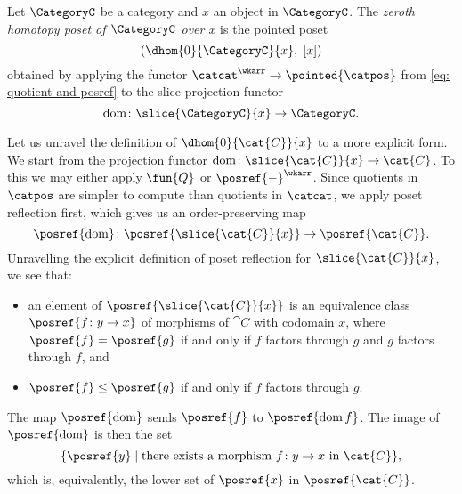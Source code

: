 %
%
\begin{definition} \label{def: 0th-directed homotopy poset}
    Let $\CategoryC$ be a category and $x$ an object in $\CategoryC$.
    The \emph{zeroth homotopy poset of $\CategoryC$ over $x$} is the pointed poset
    \begin{equation*}
        (\dhom{0}{\CategoryC}{x}, \; [x])
    \end{equation*}
    obtained by applying the functor $\catcat^\wkarr \to \pointed{\catpos}$ from \autoref{eq: quotient and posref} to the slice projection functor
    \begin{equation*}
        \mathrm{dom}\colon \slice{\CategoryC}{x} \to \CategoryC.
    \end{equation*}
\end{definition}
%
%
Let us unravel the definition of $\dhom{0}{\cat{C}}{x}$ to a more explicit form.
We start from the projection functor $\mathrm{dom}\colon \slice{\cat{C}}{x} \to \cat{C}$.
    To this we may either apply $\fun{Q}$ or $\posref{-}^\wkarr$.
    Since quotients in $\catpos$ are simpler to compute than quotients in $\catcat$, we apply poset reflection first, which gives us an order-preserving map
    \begin{equation*}
        \posref{\mathrm{dom}}\colon \posref{\slice{\cat{C}}{x}} \to \posref{\cat{C}}.
    \end{equation*}
    Unravelling the explicit definition of poset reflection for $\slice{\cat{C}}{x}$, we see that:
    \begin{itemize}
        \item an element of $\posref{\slice{\cat{C}}{x}}$ is an equivalence class $\posref{f\colon y \to x}$ of morphisms of $\cat{C}$ with codomain $x$, where $\posref{f} = \posref{g}$ if and only if $f$ factors through $g$ and $g$ factors through $f$, and
        \item $\posref{f} \leq \posref{g}$ if and only if $f$ factors through $g$.
    \end{itemize}
    The map $\posref{\mathrm{dom}}$ sends $\posref{f}$ to $\posref{\mathrm{dom}\, f}$.
    The image of $\posref{\mathrm{dom}}$ is then the set
    \begin{equation*}
        \{ \posref{y} \mid \text{there exists a morphism $f\colon y \to x$ in $\cat{C}$} \},
    \end{equation*}
    which is, equivalently, the lower set of $\posref{x}$ in $\posref{\cat{C}}$.

